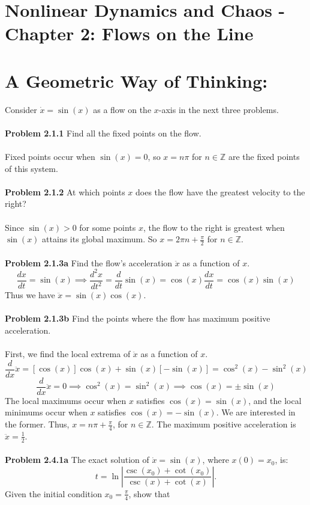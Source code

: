 \documentclass[fleqn]{article}
\newcommand{\Z}{\mathbb{Z}}
\begin{document}
\section*{Nonlinear Dynamics and Chaos - Chapter 2: Flows on the Line}
\section*{A Geometric Way of Thinking:}
Consider $\dot{x}=\sin(x)$ as a flow on the $x$-axis in the next three problems.
\\\\
\textbf{Problem 2.1.1} Find all the fixed points on the flow.
\\\\
Fixed points occur when $\sin(x)=0$, so $x=n\pi$ for $n\in\Z$ are the fixed points of this system.
\\\\
\textbf{Problem 2.1.2} At which points $x$ does the flow have the greatest velocity to the right?
\\\\
Since $\sin(x)>0$ for some points $x$, the flow to the right is greatest when $\sin(x)$ attains its global maximum. So $x=2\pi n+\frac{\pi}{2}$ for $n\in\Z$.
\\\\
\textbf{Problem 2.1.3a} Find the flow's acceleration $\ddot{x}$ as a function of $x$.
\[
\frac{dx}{dt}=\sin(x)\implies\frac{d^2x}{dt^2}=\frac{d}{dt}\sin(x)=\cos(x)\frac{dx}{dt}=\cos(x)\sin(x)
\]
Thus we have $\ddot{x}=\sin(x)\cos(x)$.
\\\\
\textbf{Problem 2.1.3b} Find the points where the flow has maximum positive acceleration.
\\\\
First, we find the local extrema of $\ddot{x}$ as a function of $x$.
\[
\frac{d}{dx}\ddot{x}=[\cos(x)]\cos(x)+\sin(x)[-\sin(x)]=\cos^2(x)-\sin^2(x)
\]
\[
\frac{d}{dx}\ddot{x}=0\implies\cos^2(x)=\sin^2(x)\implies\cos(x)=\pm\sin(x)
\]
The local maximums occur when $x$ satisfies $\cos(x)=\sin(x)$, and the local minimums occur when $x$ satisfies $\cos(x)=-\sin(x)$. We are interested in the former. Thus, $x=n\pi+\frac{\pi}{4}$, for $n\in\Z$. The maximum positive acceleration is $\ddot{x}=\frac{1}{2}$.
\\\\
\textbf{Problem 2.4.1a} The exact solution of $\dot{x}=\sin(x)$, where $x(0)=x_0$, is:
\[
t=\ln\left|\frac{\csc(x_0)+\cot(x_0)}{\csc(x)+\cot(x)}\right|.
\]
Given the initial condition $x_0=\frac{\pi}{4}$, show that
\end{document}
